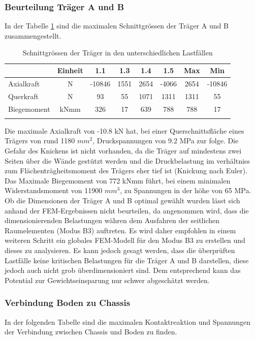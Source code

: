 \subsubsection{Beurteilung Träger A und B}
In der Tabelle \ref{tab:FEMres Träger} sind die maximalen Schnittgrössen der Träger A und B zusammengestellt.
\begin{table}[H]
\centering
\begin{tabular}{lccccccc}
\thickhline
	&	Einheit	&	1.1	&	1.3	&	1.4	&	1.5	&	Max	&	Min	\\	\hline
Axialkraft	&	N	&	-10846	&	1551	&	2654	&	-4066	&	2654	&	-10846	\\
Querkraft	&	N	&	93	&	55	&	1071	&	1311	&	1311	&	55	\\
Biegemoment	&	kNmm	&	326	&	17	&	639	&	788	&	788	&	17	\\	\thickhline
\end{tabular}
\caption{Schnittgrössen der Träger in den unterschiedlichen Lastfällen}
\label{tab:FEMres Träger}
\end{table}


Die maximale Axialkraft von -10.8 kN hat, bei einer Querschnittsfläche eines Trägers von rund 1180 $mm^2$, Druckspannungen von 9.2 MPa zur folge. Die Gefahr des Knickens ist nicht vorhanden, da die Träger auf mindestens zwei Seiten über die Wände gestützt werden und die Druckbelastung im verhältniss zum Flächenträgheitsmoment des Trägers eher tief ist (Knickung nach Euler). Das Maximale Biegemoment von 772 kNmm führt, bei einem minimalen Widerstandsmoment von 11900 $mm^3$, zu Spannungen in der höhe von 65 MPa.\\
Ob die Dimensionen der Träger A und B optimal gewählt wurden lässt sich anhand der FEM-Ergebnissen nicht beurteilen, da angenommen wird, dass die dimensionierenden Belastungen währen dem Ausfahren der seitlichen Raumelementen (Modus B3) auftreten. Es wird daher empfohlen in einem weiteren Schritt ein globales FEM-Modell für den Modus B3 zu erstellen und dieses zu analysieren. Es kann jedoch gesagt werden, dass die überprüften Lastfälle keine kritischen Belastungen für die Träger A und B darstellen, diese jedoch auch nicht grob überdimensioniert sind. Dem entsprechend kann das Potential zur Gewichtseinsparung nur schwer abgeschätzt werden.

\subsubsection{Verbindung Boden zu Chassis}
In der folgenden Tabelle sind die maximalen Kontaktreaktion und Spannungen der Verbindung zwischen Chassis und Boden zu finden.

